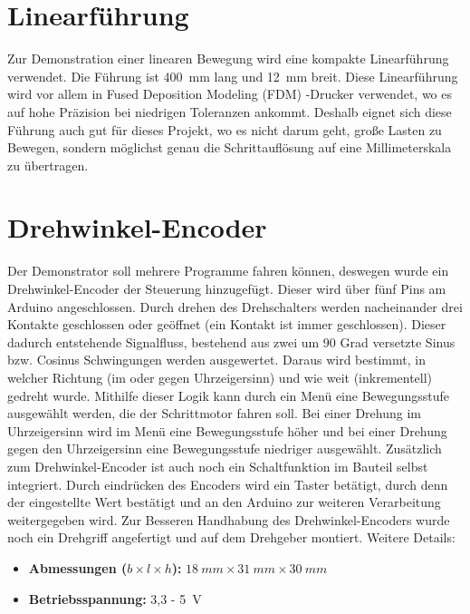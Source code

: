 \section{Linearführung}
Zur Demonstration einer linearen Bewegung wird eine kompakte Linearführung verwendet. Die Führung ist 400\ mm lang und 12\ mm breit. Diese Linearführung wird vor allem in Fused Deposition Modeling (FDM) -Drucker verwendet, wo es auf hohe Präzision bei niedrigen Toleranzen ankommt. Deshalb eignet sich diese Führung auch gut für dieses Projekt, wo es nicht darum geht, große Lasten zu Bewegen, sondern möglichst genau die Schrittauflösung auf eine Millimeterskala zu übertragen.

\section{Drehwinkel-Encoder}
Der Demonstrator soll mehrere Programme fahren können, deswegen wurde ein Drehwinkel-Encoder der Steuerung hinzugefügt. Dieser wird über fünf Pins am Arduino angeschlossen. Durch drehen des Drehschalters werden nacheinander drei Kontakte geschlossen oder geöffnet (ein Kontakt ist immer geschlossen). Dieser dadurch entstehende Signalfluss, bestehend aus zwei um 90 Grad versetzte Sinus bzw. Cosinus Schwingungen werden ausgewertet. Daraus wird bestimmt, in welcher Richtung (im oder gegen Uhrzeigersinn) und wie weit (inkrementell) gedreht wurde. Mithilfe dieser Logik kann durch ein Menü eine Bewegungsstufe ausgewählt werden, die der Schrittmotor fahren soll.\cite{Basler.2016} Bei einer Drehung im Uhrzeigersinn wird im Menü eine Bewegungsstufe höher und bei einer Drehung gegen den Uhrzeigersinn eine Bewegungsstufe niedriger ausgewählt. Zusätzlich zum Drehwinkel-Encoder ist auch noch ein Schaltfunktion im Bauteil selbst integriert. Durch eindrücken des Encoders wird ein Taster betätigt, durch denn der eingestellte Wert bestätigt und an den Arduino zur weiteren Verarbeitung weitergegeben wird. Zur Besseren Handhabung des Drehwinkel-Encoders wurde noch ein Drehgriff angefertigt und auf dem Drehgeber montiert.
Weitere Details: \begin{itemize}
	\item \textbf{Abmessungen ($b \times l \times h$):} $18 \ mm \times 31 \ mm \times 30 \ mm$
	\item \textbf{Betriebsspannung:} 3,3 - 5\ V
	\cite{SimacElec.2019}
\end{itemize}
